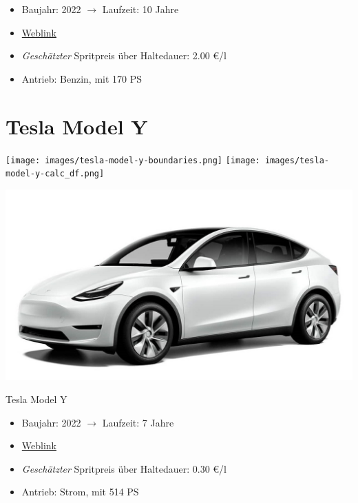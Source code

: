 \documentclass[landscape, DIV=99, 14pt]{scrartcl}
\begin{document}
\begin{itemize}
    \item Baujahr: 2022 $\rightarrow$ Laufzeit: 10 Jahre
    \item \href{https://konfigurator.meinauto.de/mercedes/neuwagen/c-klasse/angebote/c-klasse-t-modell/konfigurator/\#!/preisvergleich/-/8866563/2,47,74,81/private/43735-7309-290394/349/61d36ce4c3067/cash-purchase/73169--190162/48,0,10000,0,0,0,0,0,}{Weblink}
    \item \emph{Gesch\"atzter} Spritpreis \"uber Haltedauer: 2.00 \euro{}/l
    \item Antrieb: Benzin, mit 170 PS
\end{itemize}

\pagebreak


\twocolumn

\section*{Tesla Model Y}
\begin{center}
\texttt{[image: images/tesla-model-y-boundaries.png]}
\null
\vspace{0.5cm}
\texttt{[image: images/tesla-model-y-calc\_df.png]}
\end{center}

\pagebreak
\null
\vspace{2cm}
\begin{center}
\includegraphics[width=0.9\columnwidth]{cars/tesla-model-y.jpg}

Tesla Model Y
\end{center}

\begin{itemize}
    \item Baujahr: 2022 $\rightarrow$ Laufzeit: 7 Jahre
    \item \href{https://www.tesla.com/de_de/modely/design\#overview}{Weblink}
    \item \emph{Gesch\"atzter} Spritpreis \"uber Haltedauer: 0.30 \euro{}/l
    \item Antrieb: Strom, mit 514 PS
\end{itemize}
\end{document}
